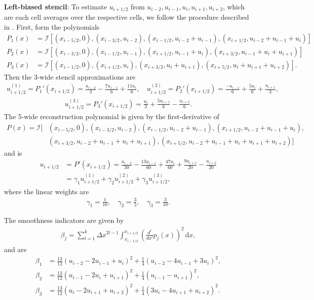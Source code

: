 \documentclass{article}
\begin{document}
\textbf{Left-biased stencil}:
To estimate $u_{i+1/2}$ from $u_{i-2}, u_{i-1}, u_i, u_{i+1}, u_{i+2}$, which are each cell averages
over the respective cells, we follow the procedure described
in \cite{shuHighOrderWeighted2009}. First, form the polynomials
\begin{align*}
    P_1(x) &= \mathcal{I}[(x_{i-5/2}, 0), (x_{i-3/2}, u_{i-2}), (x_{i-1/2}, u_{i-2}+u_{i-1}), (x_{i+1/2}, u_{i-2}+u_{i-1}+u_i)] \\
    P_2(x) &= \mathcal{I}[(x_{i-3/2}, 0), (x_{i-1/2}, u_{i-1}), (x_{i+1/2}, u_{i-1}+u_{i}), (x_{i+3/2}, u_{i-1}+u_{i}+u_{i+1})] \\
    P_3(x) &= \mathcal{I}[(x_{i-1/2}, 0), (x_{i+1/2}, u_{i}), (x_{i+3/2}, u_{i} + u_{i+1}), (x_{i+5/2}, u_i + u_{i+1} + u_{i+2})].
\end{align*}
Then the 3-wide stencil approximations are
\begin{align*}
    u^{(1)}_{i+1/2} = P_1'(x_{i+1/2}) = \frac{u_{i-2}}{3} - \frac{7u_{i-1}}{6} + \frac{11 u_i}{6}, \quad u^{(2)}_{i+1/2} = P_2'(x_{i+1/2}) = \frac{-u_{i-1}}{6} + \frac{5 u_i}{6} + \frac{u_{i+1}}{3},
\end{align*}
\begin{align*}
u^{(3)}_{i+1/2} = P_3'(x_{i+1/2}) = \frac{u_i}{3} + \frac{5u_{i+1}}{6} - \frac{u_{i+2}}{6}.
\end{align*}
The 5-wide reconstruction polynomial is given by the first-derivative of
\begin{align*}
    P(x) = \mathcal{I}[&(x_{i-5/2}, 0), (x_{i-3/2}, u_{i-2}), (x_{i-1/2}, u_{i-2}+u_{i-1}), (x_{i+1/2}, u_{i-2}+u_{i-1}+u_i), \\
                &(x_{i+3/2}, u_{i-2}+u_{i-1} + u_{i} + u_{i+1}), (x_{i+5/2}, u_{i-2}+u_{i-1} + u_i + u_{i+1} + u_{i+2})]
\end{align*}
and is
\begin{align*}
    u_{i+1/2} &= P'(x_{i+1/2}) = \frac{u_{i-2}}{30} - \frac{13 u_{i-1}}{60} + \frac{47 u_i}{60} + \frac{9 u_{i+1}}{20} - \frac{u_{i+2}}{20} \\
              &= \gamma_1 u^{(1)}_{i+1/2} + \gamma_2 u^{(2)}_{i+1/2} + \gamma_3 u^{(3)}_{i+1/2},
\end{align*}
where the linear weights are
\begin{align*}
\gamma_1 = \frac{1}{10}, \quad \gamma_2 = \frac{3}{5}, \quad \gamma_3 = \frac{3}{10}.
\end{align*}

The smoothness indicators are given by
\begin{align*}
    \beta_j = \sum_{l=1}^k \Delta x^{2l-1} \int_{x_{i-1/2}}^{x_{i+1/2}} \left( \frac{d^l}{dx^l}p_j(x) \right)^2\,\mathrm{d} x,
\end{align*}
and are
\begin{align*}
    \beta_1 &= \frac{13}{12}(u_{i-2} - 2 u_{i-1} + u_i)^2 + \frac{1}{4}(u_{i-2} - 4u_{i-1} + 3u_i)^2, \\
    \beta_2 &= \frac{13}{12}(u_{i-1} - 2 u_i + u_{i+1})^2 + \frac{1}{4}(u_{i-1} - u_{i+1})^2, \\
    \beta_3 &= \frac{13}{12}(u_i - 2u_{i+1} + u_{i+2})^2 + \frac{1}{4}(3u_i - 4u_{i+1} + u_{i+2})^2.
\end{align*}
\end{document}
